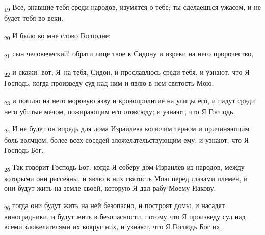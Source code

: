 \begin{tcolorbox}
\textsubscript{19} Все, знавшие тебя среди народов, изумятся о тебе; ты сделаешься ужасом, и не будет тебя во веки.
\end{tcolorbox}
\begin{tcolorbox}
\textsubscript{20} И было ко мне слово Господне:
\end{tcolorbox}
\begin{tcolorbox}
\textsubscript{21} сын человеческий! обрати лице твое к Сидону и изреки на него пророчество,
\end{tcolorbox}
\begin{tcolorbox}
\textsubscript{22} и скажи: вот, Я--на тебя, Сидон, и прославлюсь среди тебя, и узнают, что Я Господь, когда произведу суд над ним и явлю в нем святость Мою;
\end{tcolorbox}
\begin{tcolorbox}
\textsubscript{23} и пошлю на него моровую язву и кровопролитие на улицы его, и падут среди него убитые мечом, пожирающим его отовсюду; и узнают, что Я Господь.
\end{tcolorbox}
\begin{tcolorbox}
\textsubscript{24} И не будет он впредь для дома Израилева колючим терном и причиняющим боль волчцом, более всех соседей зложелательствующим ему, и узнают, что Я Господь Бог.
\end{tcolorbox}
\begin{tcolorbox}
\textsubscript{25} Так говорит Господь Бог: когда Я соберу дом Израилев из народов, между которыми они рассеяны, и явлю в них святость Мою перед глазами племен, и они будут жить на земле своей, которую Я дал рабу Моему Иакову:
\end{tcolorbox}
\begin{tcolorbox}
\textsubscript{26} тогда они будут жить на ней безопасно, и построят домы, и насадят виноградники, и будут жить в безопасности, потому что Я произведу суд над всеми зложелателями их вокруг них, и узнают, что Я Господь Бог их.
\end{tcolorbox}
